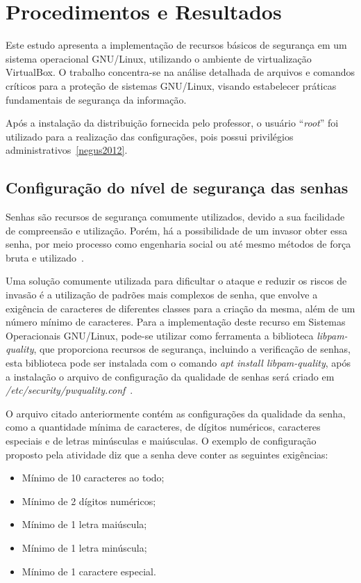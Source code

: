 \documentclass[
  12pt,				%
  oneside,   	        %
  a4paper,			%
  english,			%
  french,				%
  spanish,			%
  brazil,				%
  ]{pacotes/abntex2}
\begin{document}
\section{Procedimentos e Resultados}
\label{sec:procedimentos}

Este estudo apresenta a implementação de recursos básicos de segurança em um sistema operacional GNU/Linux, utilizando o ambiente de virtualização VirtualBox. O trabalho concentra-se na análise detalhada de arquivos e comandos críticos para a proteção de sistemas GNU/Linux, visando estabelecer práticas fundamentais de segurança da informação.

Após a instalação da distribuição fornecida pelo professor, o usuário ``\textit{root}'' foi utilizado para a realização das configurações, pois possui privilégios administrativos~\ref{negus2012}.

\subsection{Configuração do nível de segurança das senhas}
\label{subsec:senhas}

Senhas são recursos de segurança comumente utilizados, devido a sua facilidade de compreensão e utilização. Porém, há a possibilidade de um invasor obter essa senha, por meio processo como engenharia social ou até mesmo métodos de força bruta e utilizado~\cite{silberschatz2015}.

Uma solução comumente utilizada para dificultar o ataque e reduzir os riscos de invasão é a utilização de padrões mais complexos de senha, que envolve a exigência de caracteres de diferentes classes para a criação da mesma, além de um número mínimo de caracteres. Para a implementação deste recurso em Sistemas Operacionais GNU/Linux, pode-se utilizar como ferramenta a biblioteca \textit{libpam-quality}, que proporciona recursos de segurança, incluindo a verificação de senhas, esta biblioteca pode ser instalada com o comando \textit{apt install libpam-quality}, após a instalação o arquivo de configuração da qualidade de senhas será criado em \textit{/etc/security/pwquality.conf}~\cite{libpam-pwquality}.

O arquivo citado anteriormente contém as configurações da qualidade da senha, como a quantidade mínima de caracteres, de dígitos numéricos, caracteres especiais e de letras minúsculas e maiúsculas. O exemplo de configuração proposto pela atividade diz que a senha deve conter as seguintes exigências:

\begin{itemize}
    \item Mínimo de 10 caracteres ao todo;
    \item Mínimo de 2 dígitos numéricos;
    \item Mínimo de 1 letra maiúscula;
    \item Mínimo de 1 letra minúscula;
    \item Mínimo de 1 caractere especial.
\end{itemize}
\end{document}
